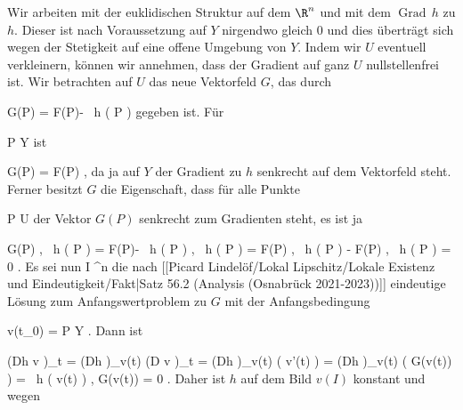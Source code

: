 {

Wir arbeiten mit der euklidischen Struktur auf dem $\R^n$ und mit dem
$\operatorname{Grad} \,  h$ zu $h$. Dieser ist nach Voraussetzung auf $Y$ nirgendwo gleich $0$ und dies überträgt sich wegen der Stetigkeit auf eine offene Umgebung von $Y$. Indem wir $U$ eventuell verkleinern, können wir annehmen, dass der Gradient auf ganz $U$ nullstellenfrei ist. Wir betrachten auf $U$  das neue Vektorfeld $G$, das durch

\mavergleichskettedisp
{\vergleichskette
{ G(P)
}
{ =} { F(P)-  {  }
 \,  h  (  P )
}
{ } {
}
{ } {
}
{ } {
}
}
{}{}{}
gegeben ist. Für

\mavergleichskette
{\vergleichskette
{ P
}
{ \in }{ Y
}
{  }{
}
{    }{
}
{   }{
}
}
{}{}{}
ist

\mavergleichskette
{\vergleichskette
{ G(P)
}
{ = }{ F(P)
}
{  }{
}
{    }{
}
{   }{
}
}
{}{}{,}
da ja auf $Y$ der Gradient zu $h$ senkrecht auf dem Vektorfeld steht. Ferner besitzt $G$
 {} {}
die Eigenschaft, dass für alle Punkte

\mavergleichskette
{\vergleichskette
{ P
}
{ \in }{ U
}
{  }{
}
{    }{
}
{   }{
}
}
{}{}{}
der Vektor $G(P)$ senkrecht zum Gradienten steht, es ist ja

\mavergleichskettealignhandlinks
{\vergleichskettealignhandlinks
{ \left\langle  G(P) ,
 \,  h  (  P )   \right\rangle
}
{ =} { \left\langle  F(P)- {  }
 \,  h  (  P )  ,
 \,  h  (  P )   \right\rangle
}
{ =} { \left\langle  F(P) ,
 \,  h  (  P )   \right\rangle - \left\langle  F(P) ,
 \,  h  (  P )   \right\rangle
}
{ =} { 0
}
{ } {
}
}
{}
{}{.}
Es sei nun
 { I} { \R^n
} {}
die nach
[[Picard Lindelöf/Lokal Lipschitz/Lokale Existenz und Eindeutigkeit/Fakt|Satz 56.2 (Analysis (Osnabrück 2021-2023))]]
eindeutige Lösung zum Anfangswertproblem zu $G$ mit der Anfangsbedingung

\mavergleichskette
{\vergleichskette
{ v(t_0)
}
{ = }{ P
}
{ \in }{ Y
}
{    }{
}
{   }{
}
}
{}{}{.}
Dann ist

\mavergleichskettealign
{\vergleichskettealign
{ \left(Dh \circ v \right)_{t}
}
{ =} { \left(Dh  \right)_{v(t)} \circ  \left(D v \right)_{t}
}
{ =} { \left(Dh  \right)_{v(t)}  \left(  v'(t)  \right)
}
{ =} { \left(Dh  \right)_{v(t)}  \left(  G(v(t))  \right)
}
{ =} { \left\langle
{} \,  h  ( v(t) )  ,  G(v(t))    \right\rangle
}
}
{
\vergleichskettefortsetzungalign
{ =} { 0
}
{ } {}
{ } {}
{ } {}
}
{}{.}
Daher ist $h$ auf dem Bild $v( I)$ konstant und wegen

}
